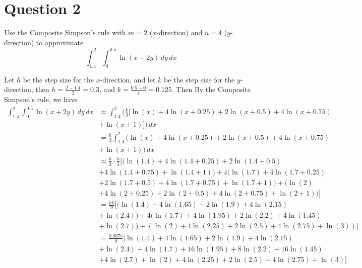 \section{Question 2}

\begin{question}
    Use the Composite Simpson's rule with $m=2$ ($x$-direction) and $n=4$ ($y$-direction) to approximate
    \begin{equation}
        \int_{1.4}^2 \int_{0}^{0.5} \ln (x+2y) \, dy \, dx
    \end{equation}
\end{question}

\begin{answer}
    Let $h$ be the step size for the $x$-direction, and let $k$ be the step size for the $y$-direction, then $h = \tfrac{2-1.4}{2} = 0.3$, and $k = \tfrac{0.5-0}{4} = 0.125$. Then By the Composite Simpson's rule, we have
    \begin{align}
        \int_{1.4}^2 \int_{0}^{0.5} \ln (x+2y) \,dy \,dx &\approx \int_{1.4}^2 (\tfrac{k}{3}[\ln(x) + 4\ln (x+0.25) + 2 \ln (x + 0.5) + 4 \ln(x + 0.75)\\
        &+ \ln(x + 1)]) \, dx\\
        &= \tfrac{k}{3}\int_{1.4}^2 (\ln(x) + 4\ln (x+0.25) + 2 \ln (x + 0.5) + 4 \ln(x + 0.75)\\
        &+ \ln(x + 1)) \, dx\\
        &\approx \tfrac{k}{3}\cdot\tfrac{h}{3}[(\ln(1.4) + 4\ln (1.4+0.25) + 2 \ln (1.4 + 0.5)\\
        &+ 4 \ln(1.4 + 0.75) +  \ln(1.4 + 1)) + 4(\ln(1.7) + 4\ln (1.7+0.25)\\
        &+ 2 \ln (1.7 + 0.5) + 4 \ln(1.7 + 0.75) + \ln(1.7 + 1)) + (\ln(2)\\
        &+ 4\ln (2+0.25) + 2 \ln (2 + 0.5) + 4 \ln(2 + 0.75) + \ln(2 + 1))]\\
        &= \tfrac{hk}{9}[(\ln(1.4) + 4\ln (1.65) + 2 \ln (1.9) + 4 \ln(2.15)\\
        &+  \ln(2.4)) + 4(\ln(1.7) + 4\ln (1.95) + 2 \ln (2.2) + 4 \ln(1.45)\\
        &+ \ln(2.7)) + (\ln(2) + 4\ln (2.25) + 2 \ln (2.5) + 4 \ln(2.75) + \ln(3))]\\
        &= \tfrac{0.0375}{9}[\ln(1.4) + 4\ln (1.65) + 2 \ln (1.9) + 4 \ln(2.15)\\
        &+  \ln(2.4) + 4\ln(1.7) + 16\ln (1.95) + 8 \ln (2.2) + 16 \ln(1.45)\\
        &+ 4\ln(2.7) + \ln(2) + 4\ln (2.25) + 2 \ln (2.5) + 4 \ln(2.75) + \ln(3)]\\

\end{align}
\end{answer}
